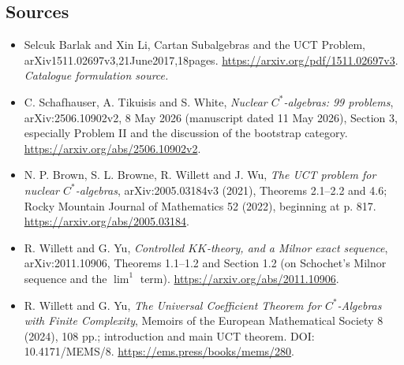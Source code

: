 \documentclass[11pt,a4paper]{article}
\begin{document}
\subsection{Sources}
\begin{itemize}\raggedright
\item[\textnormal{[S1]}]\hypertarget{source:30006980:1}{} Selcuk Barlak and Xin Li, Cartan Subalgebras and the UCT Problem, arXiv1511.02697v3,21June2017,18pages.
\url{https://arxiv.org/pdf/1511.02697v3}.
{\small\textit{Catalogue formulation source.}}
\item[\textnormal{[E1]}]\hypertarget{extra:30006980:1}{}
C. Schafhauser, A. Tikuisis and S. White,
\emph{Nuclear $C^*$-algebras: 99 problems}, arXiv:2506.10902v2,
8 May 2026 (manuscript dated 11 May 2026), Section 3, especially Problem II
and the discussion of the bootstrap category.
\url{https://arxiv.org/abs/2506.10902v2}.
\item[\textnormal{[E2]}]\hypertarget{extra:30006980:2}{}
N. P. Brown, S. L. Browne, R. Willett and J. Wu,
\emph{The UCT problem for nuclear $C^*$-algebras},
arXiv:2005.03184v3 (2021), Theorems 2.1--2.2 and 4.6;
Rocky Mountain Journal of Mathematics 52 (2022), beginning at p. 817.
\url{https://arxiv.org/abs/2005.03184}.
\item[\textnormal{[E3]}]\hypertarget{extra:30006980:3}{}
R. Willett and G. Yu, \emph{Controlled $KK$-theory, and a Milnor exact
sequence}, arXiv:2011.10906, Theorems 1.1--1.2 and Section 1.2
(on Schochet's Milnor sequence and the $\lim^1$ term).
\url{https://arxiv.org/abs/2011.10906}.
\item[\textnormal{[E4]}]\hypertarget{extra:30006980:4}{}
R. Willett and G. Yu, \emph{The Universal Coefficient Theorem for
$C^*$-Algebras with Finite Complexity}, Memoirs of the European
Mathematical Society 8 (2024), 108 pp.; introduction and main UCT theorem.
DOI: 10.4171/MEMS/8.
\url{https://ems.press/books/mems/280}.
\end{itemize}
\end{document}
